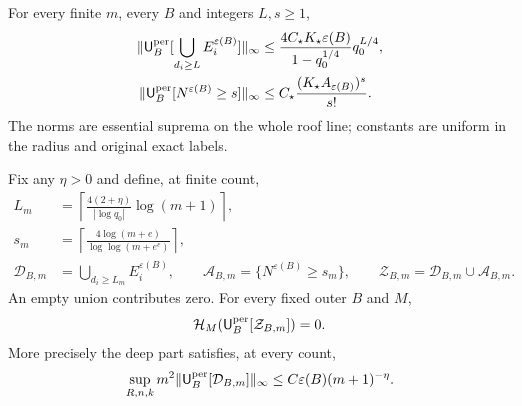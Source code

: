 \begin{theorem}
\label{thm:v111-witness-payment}
For every finite $m$, every $B$ and integers $L,s\ge1$,
\begin{align}
 \|\mathsf U_B^{\rm per}[\bigcup_{d_i\ge L}E_i^{\varepsilon(B)}]\|_\infty
 &\le \frac{4C_\star K_\star\varepsilon(B)}{1-q_0^{1/4}}
                         q_0^{L/4},\label{eq:v111-deep-finite}\\
 \|\mathsf U_B^{\rm per}[N^{\varepsilon(B)}\ge s]\|_\infty
 &\le C_\star\frac{(K_\star A_{\varepsilon(B)})^s}{s!}.
                                      \label{eq:v111-many-finite}
\end{align}
The norms are essential suprema on the whole roof line; constants
are uniform in the radius and original exact labels.

Fix any $\eta>0$ and define, at finite count,
\begin{equation}\label{eq:v111-collision-depth}
 \begin{split}
 L_m&=\left\lceil\frac{4(2+\eta)}{|\log q_0|}\log(m+1)\right\rceil,\\
 s_m&=\left\lceil\frac{4\log(m+e)}{\log\log(m+e^e)}\right\rceil,\\
 \mathcal D_{B,m}&=\bigcup_{d_i\ge L_m}E_i^{\varepsilon(B)},\qquad
 \mathcal A_{B,m}=\{N^{\varepsilon(B)}\ge s_m\},\qquad
 \mathcal Z_{B,m}=\mathcal D_{B,m}\cup\mathcal A_{B,m}.
 \end{split}
\end{equation}
An empty union contributes zero. For every fixed outer $B$ and $M$,
\begin{equation}\label{eq:v111-zero-height}
                 \mathcal H_M(\mathsf U_B^{\rm per}[\mathcal Z_{B,m}])=0.
\end{equation}
More precisely the deep part satisfies, at every count,
\begin{equation}\label{eq:v111-deep-rate}
 \sup_{R,n,k}m^2
 \|\mathsf U_B^{\rm per}[\mathcal D_{B,m}]\|_\infty
       \le C\varepsilon(B)(m+1)^{-\eta}.
\end{equation}
\end{theorem}
